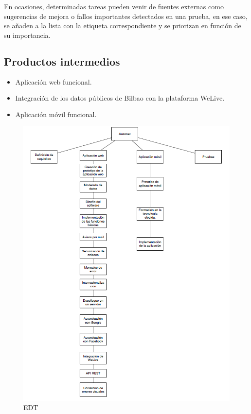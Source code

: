 \documentclass{DeustoFDP}
\begin{document}
En ocasiones, determinadas tareas pueden venir de fuentes externas como sugerencias de mejora o fallos importantes detectados en una prueba, en ese caso, se añaden a la lista con la etiqueta correspondiente y se priorizan en función de su importancia.

\subsection{Productos intermedios}
\begin{itemize}
   	\item Aplicación web funcional.
   	\item Integración de los datos públicos de Bilbao con la plataforma WeLive.
   	\item Aplicación móvil funcional.
\end{itemize}
\newpage
\begin{figure}[H]
   	\centering
   	\includegraphics{fig/EDT}
   	\caption{EDT}\label{fig:edt}
\end{figure}
\end{document}
